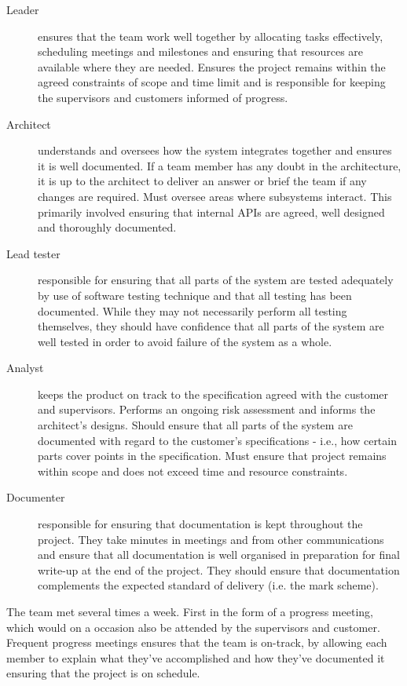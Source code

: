 \begin{description}
\item[Leader] ensures that the team work well together by allocating tasks effectively, scheduling meetings and milestones and ensuring that resources are available where they are needed. Ensures the project remains within the agreed constraints of scope and time limit and is responsible for keeping the supervisors and customers informed of progress.
\item[Architect] understands and oversees how the system integrates together and ensures it is well documented. If a team member has any doubt in the architecture, it is up to the architect to deliver an answer or brief the team if any changes are required. Must oversee areas where subsystems interact. This primarily involved ensuring that internal APIs are agreed, well designed and thoroughly documented.
\item[Lead tester] responsible for ensuring that all parts of the system are tested adequately by use of software testing technique and that all testing has been documented. While they may not necessarily perform all testing themselves, they should have confidence that all parts of the system are well tested in order to avoid failure of the system as a whole.
\item[Analyst] keeps the product on track to the specification agreed with the customer and supervisors. Performs an ongoing risk assessment and informs the architect's designs. Should ensure that all parts of the system are documented with regard to the customer's specifications - i.e., how certain parts cover points in the specification. Must ensure that project remains within scope and does not exceed time and resource constraints.
\item[Documenter] responsible for ensuring that documentation is kept throughout the project. They take minutes in meetings and from other communications and ensure that all documentation is well organised in preparation for final write-up at the end of the project. They should ensure that documentation complements the expected standard of delivery (i.e. the mark scheme).
\end{description}

The team met several times a week. First in the form of a progress meeting, which would on a occasion also be attended by the supervisors and customer. Frequent progress meetings ensures that the team is on-track, by allowing each member to explain what they've accomplished and how they've documented it ensuring that the project is on schedule.
 
